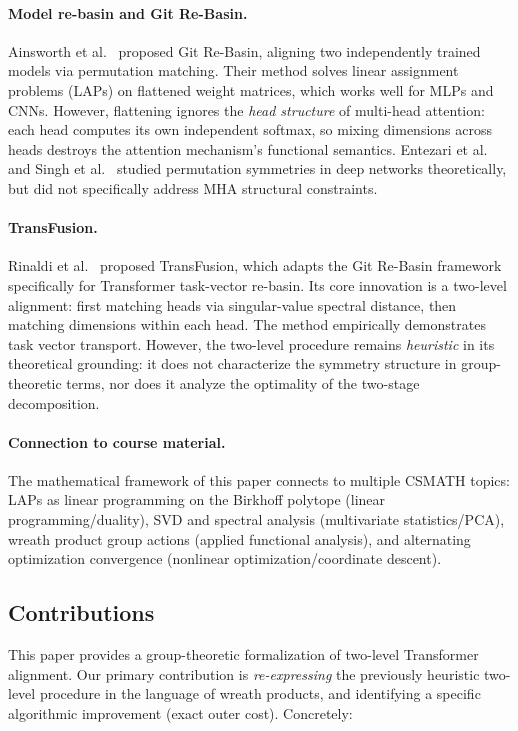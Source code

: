 \paragraph{Model re-basin and Git Re-Basin.} Ainsworth et al.~\cite{Ainsworth2023} proposed Git Re-Basin, aligning two independently trained models via permutation matching. Their method solves linear assignment problems (LAPs) on flattened weight matrices, which works well for MLPs and CNNs. However, flattening ignores the \emph{head structure} of multi-head attention: each head computes its own independent softmax, so mixing dimensions across heads destroys the attention mechanism's functional semantics. Entezari et al.~\cite{Entezari2022} and Singh et al.~\cite{Singh2023} studied permutation symmetries in deep networks theoretically, but did not specifically address MHA structural constraints.

\paragraph{TransFusion.} Rinaldi et al.~\cite{Rinaldi2025} proposed TransFusion, which adapts the Git Re-Basin framework specifically for Transformer task-vector re-basin. Its core innovation is a two-level alignment: first matching heads via singular-value spectral distance, then matching dimensions within each head. The method empirically demonstrates task vector transport. However, the two-level procedure remains \emph{heuristic} in its theoretical grounding: it does not characterize the symmetry structure in group-theoretic terms, nor does it analyze the optimality of the two-stage decomposition.

\paragraph{Connection to course material.} The mathematical framework of this paper connects to multiple CSMATH topics: LAPs as linear programming on the Birkhoff polytope (linear programming/duality), SVD and spectral analysis (multivariate statistics/PCA), wreath product group actions (applied functional analysis), and alternating optimization convergence (nonlinear optimization/coordinate descent).

\subsection{Contributions}

This paper provides a group-theoretic formalization of two-level Transformer alignment. Our primary contribution is \emph{re-expressing} the previously heuristic two-level procedure in the language of wreath products, and identifying a specific algorithmic improvement (exact outer cost). Concretely:


